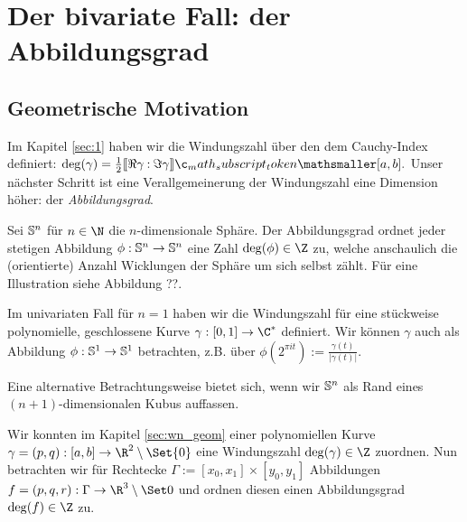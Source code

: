 \documentclass{mythesis}
\begin{document}



\clearpage

\section{Der bivariate Fall: der Abbildungsgrad} \label{sec:2}


\subsection{Geometrische Motivation}


Im Kapitel \ref{sec:1} haben wir die Windungszahl über den dem Cauchy-Index definiert:
\begin{math}
    \deg(\gamma) = \frac{1}{2} \Index{[a,b]}{\Re \gamma}{\Im \gamma}.
\end{math}
Unser nächster Schritt ist eine Verallgemeinerung der Windungszahl eine Dimension höher: der \emph{Abbildungsgrad}.

Sei $\S^n$ für $n \in \N$ die $n$-dimensionale Sphäre.
Der Abbildungsgrad ordnet jeder stetigen Abbildung $\phi: \S^n \to \S^n$ eine Zahl $\deg(\phi) \in \Z$ zu, welche anschaulich die (orientierte) Anzahl Wicklungen der Sphäre um sich selbst zählt.
Für eine Illustration siehe Abbildung ??.

Im univariaten Fall für $n = 1$ haben wir die Windungszahl für eine stückweise polynomielle, geschlossene Kurve $\gamma: [0,1] \to \C^*$ definiert.
Wir können $\gamma$ auch als Abbildung $\phi: \S^1 \to \S^1$ betrachten, z.B. über $\phi(2^{\pi i t}) := \frac{\gamma(t)}{|\gamma(t)|}$.

Eine alternative Betrachtungsweise bietet sich, wenn wir $\S^n$ als Rand eines $(n+1)$-dimensionalen Kubus auffassen.

Wir konnten im Kapitel \ref{sec:wn_geom} einer polynomiellen Kurve $\gamma = (p,q): [a,b] \to \R^2 \setminus \Set{0}$ eine Windungszahl $\deg(\gamma) \in \Z$ zuordnen.
Nun betrachten wir für Rechtecke $\Gamma := [x_0, x_1] \times [y_0, y_1]$ Abbildungen $f = (p,q,r): \Gamma \to \R^3 \setminus \Set 0$ und ordnen diesen einen Abbildungsgrad $\deg(f) \in \Z$ zu.
\end{document}
